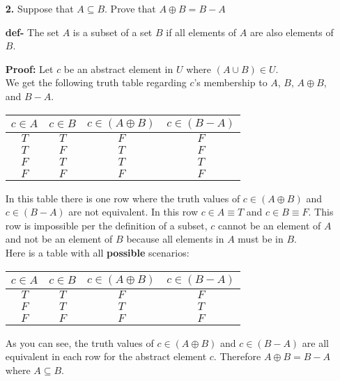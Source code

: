 \documentclass[16pt]{article}
\begin{document}
\begin{enumerate}
    \item[\textbf{2.}] Suppose that $A \subseteq B$. Prove that $A \oplus B = B - A$
    \item[\textbf{def-}] The set $A$ is a subset of a set $B$ if all elements of $A$ are also elements of $B$.
    \item[\textbf{Proof:}] Let $c$ be an abstract element in $U$ where $(A \cup B) \in U$.\\
    We get the following truth table regarding $c$'s membership to $A$, $B$, $A \oplus B$, and $B - A$.
    
    \begin{tabular}{|c|c|c|c|}
    \hline
    $c \in A$ & $c \in B$ & $c \in (A \oplus B)$ & $c \in (B - A)$ \\
    \hline
    $T$ & $T$ & $F$ & $F$ \\
    \hline
    $T$ & $F$ & $T$ & $F$ \\
    \hline
    $F$ & $T$ & $T$ & $T$ \\
    \hline
    $F$ & $F$ & $F$ & $F$ \\
    \hline
    \end{tabular}
    \item[] In this table there is one row where the truth values of $c \in (A \oplus B)$ and $c \in (B - A)$ are not equivalent. In this row $c \in A \equiv T$ and $c \in B \equiv F$. This row is impossible per the definition of a subset, $c$ cannot be an element of $A$ and not be an element of $B$ because all elements in $A$ must be in $B$. \\Here is a table with all \textbf{possible} scenarios:\\
    \begin{tabular}{|c|c|c|c|}
    \hline
    $c \in A$ & $c \in B$ & $c \in (A \oplus B)$ & $c \in (B - A)$ \\
    \hline
    $T$ & $T$ & $F$ & $F$ \\
    \hline
    $F$ & $T$ & $T$ & $T$ \\
    \hline
    $F$ & $F$ & $F$ & $F$ \\
    \hline
    \end{tabular}
    \item[] As you can see, the truth values of $c \in (A \oplus B)$ and $c \in (B - A)$ are all equivalent in each row for the abstract element $c$. Therefore $A \oplus B = B - A$ where $A \subseteq B$. \square
\end{enumerate}
\end{document}
